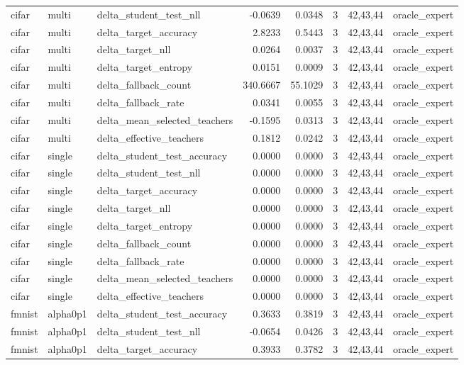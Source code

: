 \begin{tabular}{lllrrrll}
cifar & multi & delta\_student\_test\_nll & -0.0639 & 0.0348 & 3 & 42,43,44 & oracle\_expert \\
cifar & multi & delta\_target\_accuracy & 2.8233 & 0.5443 & 3 & 42,43,44 & oracle\_expert \\
cifar & multi & delta\_target\_nll & 0.0264 & 0.0037 & 3 & 42,43,44 & oracle\_expert \\
cifar & multi & delta\_target\_entropy & 0.0151 & 0.0009 & 3 & 42,43,44 & oracle\_expert \\
cifar & multi & delta\_fallback\_count & 340.6667 & 55.1029 & 3 & 42,43,44 & oracle\_expert \\
cifar & multi & delta\_fallback\_rate & 0.0341 & 0.0055 & 3 & 42,43,44 & oracle\_expert \\
cifar & multi & delta\_mean\_selected\_teachers & -0.1595 & 0.0313 & 3 & 42,43,44 & oracle\_expert \\
cifar & multi & delta\_effective\_teachers & 0.1812 & 0.0242 & 3 & 42,43,44 & oracle\_expert \\
cifar & single & delta\_student\_test\_accuracy & 0.0000 & 0.0000 & 3 & 42,43,44 & oracle\_expert \\
cifar & single & delta\_student\_test\_nll & 0.0000 & 0.0000 & 3 & 42,43,44 & oracle\_expert \\
cifar & single & delta\_target\_accuracy & 0.0000 & 0.0000 & 3 & 42,43,44 & oracle\_expert \\
cifar & single & delta\_target\_nll & 0.0000 & 0.0000 & 3 & 42,43,44 & oracle\_expert \\
cifar & single & delta\_target\_entropy & 0.0000 & 0.0000 & 3 & 42,43,44 & oracle\_expert \\
cifar & single & delta\_fallback\_count & 0.0000 & 0.0000 & 3 & 42,43,44 & oracle\_expert \\
cifar & single & delta\_fallback\_rate & 0.0000 & 0.0000 & 3 & 42,43,44 & oracle\_expert \\
cifar & single & delta\_mean\_selected\_teachers & 0.0000 & 0.0000 & 3 & 42,43,44 & oracle\_expert \\
cifar & single & delta\_effective\_teachers & 0.0000 & 0.0000 & 3 & 42,43,44 & oracle\_expert \\
fmnist & alpha0p1 & delta\_student\_test\_accuracy & 0.3633 & 0.3819 & 3 & 42,43,44 & oracle\_expert \\
fmnist & alpha0p1 & delta\_student\_test\_nll & -0.0654 & 0.0426 & 3 & 42,43,44 & oracle\_expert \\
fmnist & alpha0p1 & delta\_target\_accuracy & 0.3933 & 0.3782 & 3 & 42,43,44 & oracle\_expert \\

\end{tabular}
